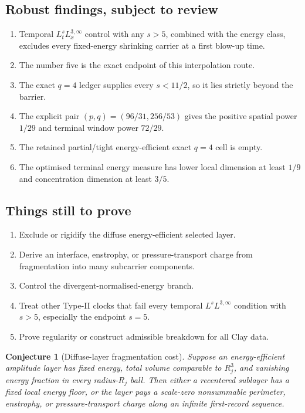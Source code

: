 \documentclass[11pt]{article}
\newtheorem{conjecture}[theorem]{Conjecture}
\theoremstyle{remark}
\begin{document}
\subsection*{Robust findings, subject to review}

\begin{enumerate}
\item Temporal \(L^s_tL^{3,\infty}_x\) control with any \(s>5\), combined
with the energy class, excludes every fixed-energy shrinking carrier at a
first blow-up time.
\item The number five is the exact endpoint of this interpolation route.
\item The exact \(q=4\) ledger supplies every \(s<11/2\), so it lies
strictly beyond the barrier.
\item The explicit pair \((p,q)=(96/31,256/53)\) gives the positive spatial
power \(1/29\) and terminal window power \(72/29\).
\item The retained partial/tight energy-efficient exact \(q=4\) cell is
empty.
\item The optimised terminal energy measure has lower local dimension at
least \(1/9\) and concentration dimension at least \(3/5\).
\end{enumerate}

\subsection*{Things still to prove}

\begin{enumerate}
\item Exclude or rigidify the diffuse energy-efficient selected layer.
\item Derive an interface, enstrophy, or pressure-transport charge from
fragmentation into many subcarrier components.
\item Control the divergent-normalised-energy branch.
\item Treat other Type-II clocks that fail every temporal
\(L^sL^{3,\infty}\) condition with \(s>5\), especially the endpoint \(s=5\).
\item Prove regularity or construct admissible breakdown for all Clay data.
\end{enumerate}

\begin{conjecture}[Diffuse-layer fragmentation cost]
Suppose an energy-efficient amplitude layer has fixed energy, total volume
comparable to \(R_j^3\), and vanishing energy fraction in every
radius-\(R_j\) ball.  Then either a recentered sublayer has a fixed local
energy floor, or the layer pays a scale-zero nonsummable perimeter,
enstrophy, or pressure-transport charge along an infinite first-record
sequence.
\end{conjecture}
\end{document}
